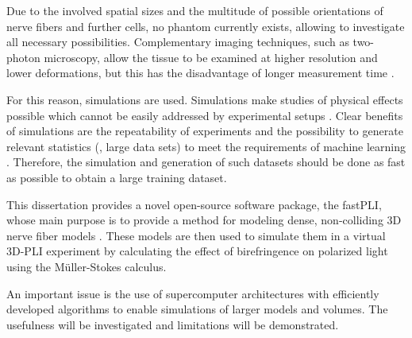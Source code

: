 Due to the involved spatial sizes and the multitude of possible orientations of nerve fibers and further cells, no phantom currently exists, allowing to investigate all necessary possibilities.
Complementary imaging techniques, such as two-photon microscopy, allow the tissue to be examined at higher resolution and lower deformations, but this has the disadvantage of longer measurement time \cite{Costantini2020, Costantini2021}.
\par
%
For this reason, simulations are used.
Simulations make studies of physical effects possible which cannot be easily addressed by experimental setups \cite{Callaghan2019, Menzel2020}.
Clear benefits of simulations are the repeatability of experiments and the possibility to generate relevant statistics (\ie{}, large data sets) to meet \eg{} the requirements of machine learning \cite{Ginsburger2018, ginsburgerDis2019}.
Therefore, the simulation and generation of such datasets should be done as fast as possible to obtain a large training dataset.
\par
%
This dissertation provides a novel open-source software package, the \ac{fastPLI}, whose main purpose is to provide a method for modeling dense, non-colliding 3D nerve fiber models \cite{Matuschke2019, Matuschke2021, Reuter2019}.
These models are then used to simulate them in a virtual \ac{3D-PLI} experiment by calculating the effect of birefringence on polarized light using the M{\"u}ller-Stokes calculus.
\par
%
An important issue is the use of supercomputer architectures with efficiently developed algorithms to enable simulations of larger models and volumes.
The usefulness will be investigated and limitations will be demonstrated.